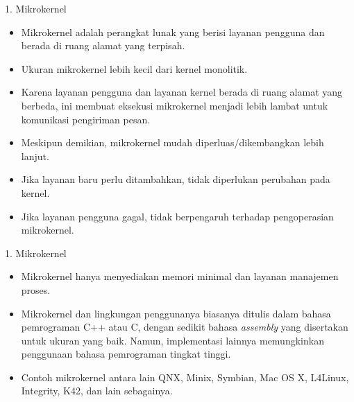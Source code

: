 \documentclass[aspectratio=169, table]{beamer}
\begin{document}
    \begin{frame}{1. Mikrokernel}
        \vspace{20pt}
        \begin{itemize}

            \item Mikrokernel adalah perangkat lunak yang berisi layanan pengguna dan berada di ruang alamat yang terpisah.
            \item Ukuran mikrokernel lebih kecil dari kernel monolitik.
            \item Karena layanan pengguna dan layanan kernel berada di ruang alamat yang berbeda, ini membuat eksekusi mikrokernel menjadi lebih lambat untuk komunikasi pengiriman pesan.
            \item Meskipun demikian, mikrokernel mudah diperluas/dikembangkan lebih lanjut.
            \item Jika layanan baru perlu ditambahkan, tidak diperlukan perubahan pada kernel.
            \item Jika layanan pengguna gagal, tidak berpengaruh terhadap pengoperasian mikrokernel.

        \end{itemize}
    \end{frame}

    \begin{frame}{1. Mikrokernel}
        \begin{itemize}
            \item Mikrokernel hanya menyediakan memori minimal dan layanan manajemen proses.
            \item Mikrokernel dan lingkungan penggunanya biasanya ditulis dalam bahasa pemrograman C++ atau C, dengan sedikit bahasa \textit{assembly} yang disertakan untuk ukuran yang baik. Namun, implementasi lainnya memungkinkan penggunaan bahasa pemrograman tingkat tinggi.
            \item Contoh mikrokernel antara lain QNX, Minix, Symbian, Mac OS X, L4Linux, Integrity, K42, dan lain sebagainya.
        \end{itemize}
    \end{frame}
\end{document}
